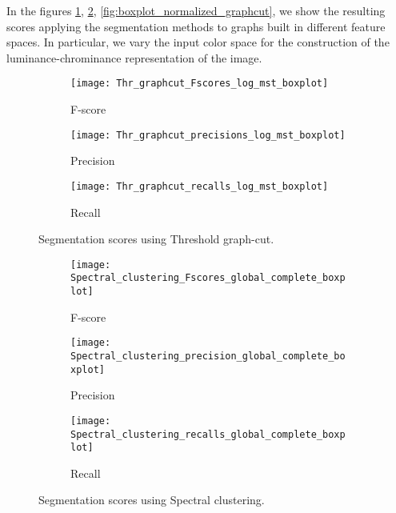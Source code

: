 In the figures \ref{fig:boxplot_threshold_graphcut}, \ref{fig:boxplot_spectral_clustering}, \ref{fig:boxplot_normalized_graphcut}, we show the resulting scores applying the segmentation methods to graphs built in different feature spaces. In particular, we vary the input color space for the construction of the luminance-chrominance representation of the image.

\begin{figure}[!ht]
    \centering
    \begin{subfigure}[b]{0.3\textwidth}
        \texttt{[image: Thr\_graphcut\_Fscores\_log\_mst\_boxplot]}
        \caption{F-score}
    \end{subfigure}     
    \begin{subfigure}[b]{0.3\textwidth}
    	\centering
    	\texttt{[image: Thr\_graphcut\_precisions\_log\_mst\_boxplot]}
        \caption{Precision}
    \end{subfigure}     
    \begin{subfigure}[b]{0.3\textwidth}
    	\centering
        \texttt{[image: Thr\_graphcut\_recalls\_log\_mst\_boxplot]}
        \caption{Recall}
    \end{subfigure} 
        	    
    \caption{Segmentation scores using Threshold graph-cut.}\label{fig:boxplot_threshold_graphcut}    
\end{figure}

\begin{figure}[!ht]
    \centering
    \begin{subfigure}[b]{0.3\textwidth}
        \texttt{[image: Spectral\_clustering\_Fscores\_global\_complete\_boxplot]}
        \caption{F-score}
    \end{subfigure}     
    \begin{subfigure}[b]{0.3\textwidth}
    	\centering
    	\texttt{[image: Spectral\_clustering\_precision\_global\_complete\_boxplot]}
        \caption{Precision}
    \end{subfigure}     
    \begin{subfigure}[b]{0.3\textwidth}
    	\centering
        \texttt{[image: Spectral\_clustering\_recalls\_global\_complete\_boxplot]}
        \caption{Recall}
    \end{subfigure} 
        	    
    \caption{Segmentation scores using Spectral clustering.}\label{fig:boxplot_spectral_clustering}    
\end{figure}

